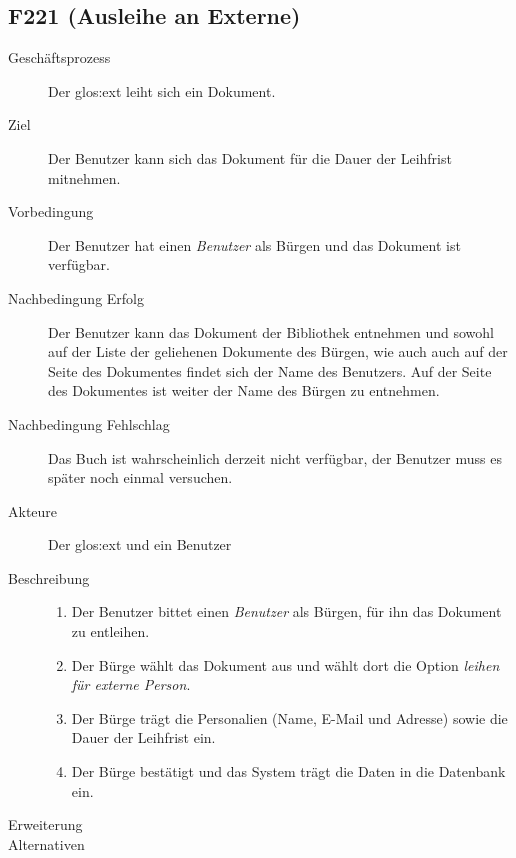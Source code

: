\subsection{F221 (Ausleihe an Externe)}
\begin{description}
  \item[Geschäftsprozess]Der \gls{glos:ext} leiht sich ein Dokument.
  \item[Ziel]Der Benutzer kann sich das Dokument für die Dauer der Leihfrist mitnehmen.
  \item[Vorbedingung]Der Benutzer hat einen \emph{Benutzer} als Bürgen und das Dokument ist verfügbar.
  \item[Nachbedingung Erfolg]Der Benutzer kann das Dokument der Bibliothek entnehmen und sowohl auf der Liste der geliehenen Dokumente des Bürgen, wie auch auch auf der Seite des Dokumentes findet sich der Name des  Benutzers. Auf der Seite des Dokumentes ist weiter der Name des Bürgen zu entnehmen.
  \item[Nachbedingung Fehlschlag]Das Buch ist wahrscheinlich derzeit nicht verfügbar, der Benutzer muss es später noch einmal versuchen.
  \item[Akteure]Der \gls{glos:ext} und ein Benutzer 
  \item[Beschreibung]\hfill
    \begin{enumerate}
      \item Der Benutzer bittet einen \emph{Benutzer} als Bürgen, für ihn das Dokument zu entleihen.
      \item Der Bürge wählt das Dokument aus und wählt dort die Option \emph{leihen für externe Person}.
      \item Der Bürge trägt die Personalien (Name, E-Mail und Adresse) sowie die Dauer der Leihfrist ein.
      \item Der Bürge bestätigt und das System trägt die Daten in die Datenbank ein.
    \end{enumerate}
  \item[Erweiterung]
  \item[Alternativen]
\end{description}

